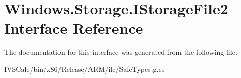 \hypertarget{interface_windows_1_1_storage_1_1_i_storage_file2}{}\section{Windows.\+Storage.\+I\+Storage\+File2 Interface Reference}
\label{interface_windows_1_1_storage_1_1_i_storage_file2}


The documentation for this interface was generated from the following file\+:\begin{DoxyCompactItemize}
\item 
I\+V\+S\+Calc/bin/x86/\+Release/\+A\+R\+M/ilc/Safe\+Types.\+g.\+cs\end{DoxyCompactItemize}
